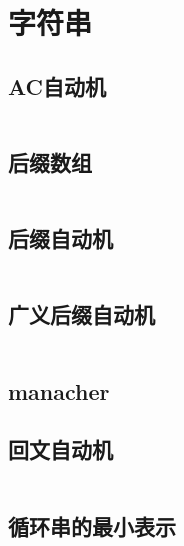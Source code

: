\chapter{字符串}
\section{AC自动机}
\inputminted{cpp}{\source/string/Aho-Corasick-automaton.cpp}
\section{后缀数组}
\inputminted{cpp}{\source/string/suffix-array.cpp}
\section{后缀自动机}
\inputminted{cpp}{\source/string/suffix-automaton.cpp}
\section{广义后缀自动机}
\inputminted{cpp}{\source/string/ex-suffix-automaton.cpp}
\section{manacher}
\section{回文自动机}
\inputminted{cpp}{\source/string/palindromic-tree.cpp}
\section{循环串的最小表示}
\inputminted{cpp}{\source/string/minexpress.cpp}
